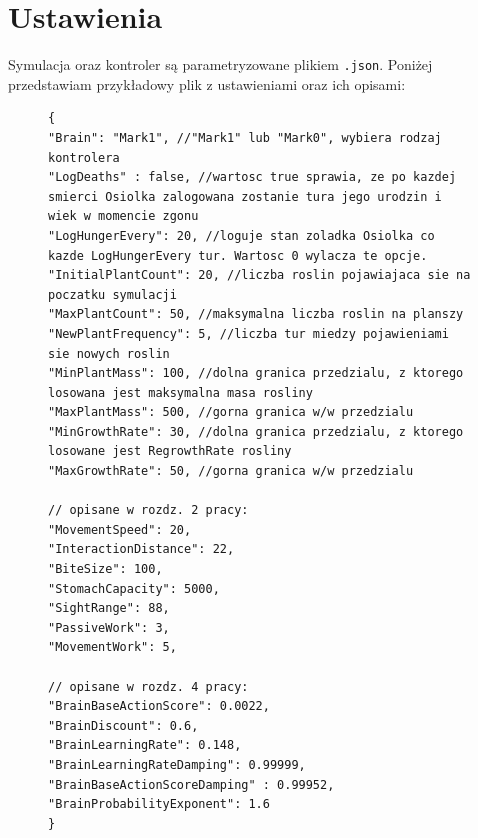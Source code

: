 \section{Ustawienia}
Symulacja oraz kontroler są parametryzowane plikiem \texttt{.json}. Poniżej przedstawiam przykładowy plik z ustawieniami oraz ich opisami:
\begin{figure}[h]
\label{fig:example_settings}
\begin{lstlisting}[language=json_comment]
{
"Brain": "Mark1", //"Mark1" lub "Mark0", wybiera rodzaj kontrolera
"LogDeaths" : false, //wartosc true sprawia, ze po kazdej smierci Osiolka zalogowana zostanie tura jego urodzin i wiek w momencie zgonu
"LogHungerEvery": 20, //loguje stan zoladka Osiolka co kazde LogHungerEvery tur. Wartosc 0 wylacza te opcje.
"InitialPlantCount": 20, //liczba roslin pojawiajaca sie na poczatku symulacji
"MaxPlantCount": 50, //maksymalna liczba roslin na planszy
"NewPlantFrequency": 5, //liczba tur miedzy pojawieniami sie nowych roslin
"MinPlantMass": 100, //dolna granica przedzialu, z ktorego losowana jest maksymalna masa rosliny
"MaxPlantMass": 500, //gorna granica w/w przedzialu
"MinGrowthRate": 30, //dolna granica przedzialu, z ktorego losowane jest RegrowthRate rosliny
"MaxGrowthRate": 50, //gorna granica w/w przedzialu

// opisane w rozdz. 2 pracy:
"MovementSpeed": 20,         
"InteractionDistance": 22,         
"BiteSize": 100,         
"StomachCapacity": 5000,        
"SightRange": 88, 
"PassiveWork": 3,
"MovementWork": 5,

// opisane w rozdz. 4 pracy:
"BrainBaseActionScore": 0.0022,
"BrainDiscount": 0.6,        
"BrainLearningRate": 0.148,        
"BrainLearningRateDamping": 0.99999,         
"BrainBaseActionScoreDamping" : 0.99952,         
"BrainProbabilityExponent": 1.6 
}
\end{lstlisting}
\end{figure}
